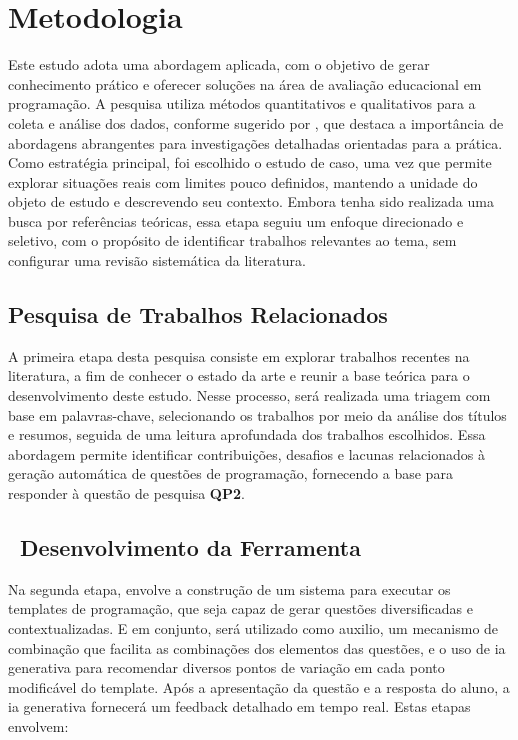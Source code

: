 \chapter{Metodologia}\label{cap:metodologia}

Este estudo adota uma abordagem aplicada, com o objetivo de gerar conhecimento prático e oferecer soluções na área de avaliação educacional em programação. A pesquisa utiliza métodos quantitativos e qualitativos para a coleta e análise dos dados, conforme sugerido por \parencite{Gil2017}, que destaca a importância de abordagens abrangentes para investigações detalhadas orientadas para a prática. Como estratégia principal, foi escolhido o estudo de caso, uma vez que permite explorar situações reais com limites pouco definidos, mantendo a unidade do objeto de estudo e descrevendo seu contexto. Embora tenha sido realizada uma busca por referências teóricas, essa etapa seguiu um enfoque direcionado e seletivo, com o propósito de identificar trabalhos relevantes ao tema, sem configurar uma revisão sistemática da literatura. 

\section{Pesquisa de Trabalhos Relacionados}

A primeira etapa desta pesquisa consiste em explorar trabalhos recentes na literatura, a fim de conhecer o estado da arte e reunir a base teórica para o desenvolvimento deste estudo. Nesse processo, será realizada uma triagem com base em palavras-chave, selecionando os trabalhos por meio da análise dos títulos e resumos, seguida de uma leitura aprofundada dos trabalhos escolhidos. Essa abordagem permite identificar contribuições, desafios e lacunas relacionados à geração automática de questões de programação, fornecendo a base para responder à questão de pesquisa \textbf{QP2}. 


\section{\textbf{ Desenvolvimento da Ferramenta} }
Na segunda etapa, envolve a construção de um sistema para executar os templates de programação, que seja capaz de gerar questões diversificadas e contextualizadas. E em conjunto, será utilizado como auxilio, um mecanismo de combinação que facilita as combinações dos elementos das questões, e o uso de \gls{ia} generativa para recomendar diversos pontos de variação em cada ponto modificável do template. Após a apresentação da questão e a resposta do aluno, a \gls{ia}  generativa fornecerá um feedback detalhado em tempo real. Estas etapas envolvem: 


